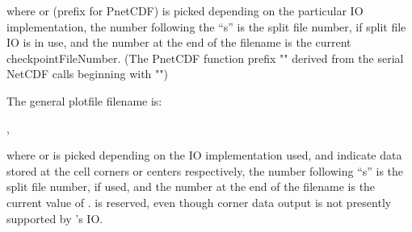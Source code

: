 \noindent
where  or  (prefix for PnetCDF) is picked
depending on the particular IO implementation, the number following the ``s'' is 
the split file number, if split file IO is in use, 
and the number at the end of the
filename is the current checkpointFileNumber.  (The PnetCDF function
prefix "" derived from the serial NetCDF calls beginning with
"")

The general plotfile filename is:
\medskip

\enskip,
\medskip



\noindent
where  or  is picked depending on the IO
implementation used,
 and  indicate data stored at the
cell corners or centers respectively, the number following ``s'' is the split file 
number, if used, and the number at the end of the
filename is the current value of .   is reserved, even though 
corner data output is not presently supported by \flashx's IO.

\begin{comment}
Similarly, the general particle filename is:
\medskip

\texttt{
basename\_$\left\{\begin{array}{c}\mathtt{hdf5}\\ \mathtt{ncmpi}\\
             \end{array}\right\}$\_part\_0000}\enskip,
\medskip

\noindent
where \code{hdf5} or \code{ncmpi} is picked depending on the IO
implementation
used, and the number at the end of the filename is the current value in 
\code{particleFileNumber}.
\end{comment}




